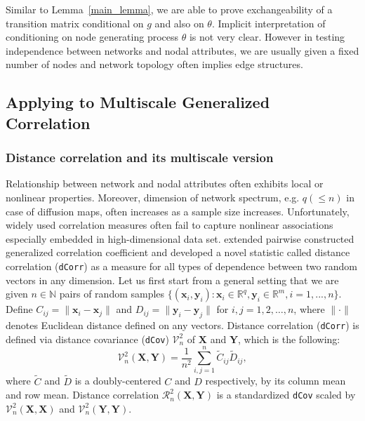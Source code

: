 \documentclass[12pt]{article}
\theoremstyle{definition}
\begin{document}
Similar to Lemma~\ref{main_lemma}, we are able to prove exchangeability of a transition matrix conditional on $g$ and also on $\theta$. Implicit interpretation of conditioning on node generating process $\theta$ is not very clear. However in testing independence between networks and nodal attributes, we are usually given a fixed number of nodes and network topology often implies edge structures. 
	
\subsection{Applying to Multiscale Generalized Correlation}
	
\subsubsection{Distance correlation and its multiscale version}
	
Relationship between network and nodal attributes often exhibits local or nonlinear properties. Moreover, dimension of network spectrum, e.g. $q (\leq n)$ in case of diffusion maps, often increases as a sample size increases. Unfortunately, widely used correlation measures often fail to capture nonlinear associations especially embedded in high-dimensional data set. \cite{szekely2007measuring} extended pairwise constructed generalized correlation coefficient and developed a novel statistic called distance correlation (\texttt{dCorr}) as a measure for all types of dependence between two random vectors in any dimension. Let us first start from a general setting that we are given $n \in \mathbb{N}$ pairs of random samples $\{ (\mathbf{x}_{i}, \mathbf{y}_{i}) : \mathbf{x}_{i} \in \mathbb{R}^{q}, \mathbf{y}_{i} \in \mathbb{R}^{m}, i = 1,...,n \}$. Define $C_{ij} = \parallel \mathbf{x}_{i} - \mathbf{x}_{j} \parallel$ and $D_{ij} = \parallel \mathbf{y}_{i} - \mathbf{y}_{j} \parallel$ for $i,j=1,2, \ldots ,n$, where $\parallel \cdot \parallel$ denotes Euclidean distance defined on any vectors.   
Distance correlation (\texttt{dCorr}) is defined via distance covariance (\texttt{dCov}) $\mathcal{V}^2_{n}$ of $\mathbf{X}$ and $\mathbf{Y}$, which is the following: 
\begin{equation}	 
\mathcal{V}^2_{n}(\mathbf{X}, \mathbf{Y}) = \frac{1}{n^2} \sum\limits_{i,j=1}^{n} \tilde{C}_{ij} \tilde{D}_{ij},
\end{equation}
where $\tilde{C}$ and $\tilde{D}$ is a doubly-centered $C$ and $D$ respectively, by its column mean and row mean. Distance correlation $\mathcal{R}^{2}_{n}(\mathbf{X}, \mathbf{Y})$ is a standardized \texttt{dCov} scaled by $\mathcal{V}^2_{n}(\mathbf{X}, \mathbf{X})$ and $\mathcal{V}^2_{n}(\mathbf{Y}, \mathbf{Y}).$
\end{document}
